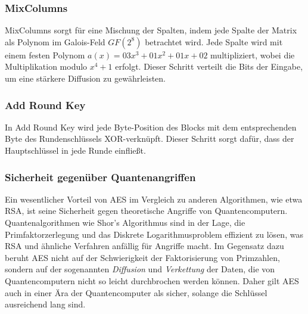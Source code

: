 \subsubsection{MixColumns}
MixColumns sorgt für eine Mischung der Spalten, indem jede Spalte der Matrix als Polynom im Galois-Feld 
\(GF(2^8)\) betrachtet wird. Jede Spalte wird mit einem festen Polynom \(a(x) = 03x^3 + 01x^2 + 01x + 02\) 
multipliziert, wobei die Multiplikation modulo \(x^4 + 1\) erfolgt. Dieser Schritt verteilt die Bits der Eingabe, 
um eine stärkere Diffusion zu gewährleisten.

\subsubsection{Add Round Key}
In Add Round Key wird jede Byte-Position des Blocks mit dem entsprechenden Byte des Rundenschlüssels 
XOR-verknüpft. Dieser Schritt sorgt dafür, dass der Hauptschlüssel in jede Runde einfließt.

\subsubsection{Sicherheit gegenüber Quantenangriffen}
Ein wesentlicher Vorteil von AES im Vergleich zu anderen Algorithmen, wie etwa RSA, ist seine Sicherheit 
gegen theoretische Angriffe von Quantencomputern. Quantenalgorithmen wie Shor's Algorithmus sind in der Lage, 
die Primfaktorzerlegung und das Diskrete Logarithmusproblem effizient zu lösen, was RSA und ähnliche Verfahren anfällig 
für Angriffe macht. Im Gegensatz dazu beruht AES nicht auf der Schwierigkeit der Faktorisierung von Primzahlen, sondern 
auf der sogenannten \textit{Diffusion} und \textit{Verkettung} der Daten, die von Quantencomputern nicht so leicht durchbrochen 
werden können. Daher gilt AES auch in einer Ära der Quantencomputer als sicher, solange die Schlüssel ausreichend lang sind.
